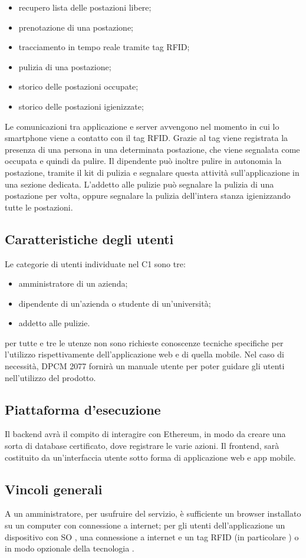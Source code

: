 \begin{itemize}
	\item recupero lista delle postazioni libere; \\
	\item prenotazione di una postazione; \\
	\item tracciamento in tempo reale tramite tag RFID; \\
	\item pulizia di una postazione; \\
	\item storico delle postazioni occupate; \\
	\item storico delle postazioni igienizzate; \\ 
\end{itemize}
Le comunicazioni tra applicazione e server avvengono nel momento in cui lo smartphone viene a contatto con il tag RFID. Grazie al tag viene registrata la presenza di una persona in una determinata postazione, che viene segnalata come occupata e quindi da pulire. Il dipendente può inoltre pulire in autonomia la postazione, tramite il kit di pulizia e segnalare questa attività sull’applicazione in una sezione dedicata.
L’addetto alle pulizie può segnalare la pulizia di una postazione per volta, oppure segnalare la pulizia dell’intera stanza igienizzando tutte le postazioni.

\subsection{Caratteristiche degli utenti}
Le categorie di utenti individuate nel C1 sono tre:
\begin{itemize}
	\item amministratore di un azienda;
	\item dipendente di un'azienda o studente di un'università;
    \item addetto alle pulizie.
\end{itemize}
per tutte e tre le utenze non sono richieste conoscenze tecniche specifiche per l'utilizzo rispettivamente dell'applicazione web e di quella mobile. Nel caso di necessità, DPCM 2077 fornirà un manuale utente per poter guidare gli utenti nell'utilizzo del prodotto.
\subsection{Piattaforma d'esecuzione}
Il backend avrà il compito di interagire con Ethereum, in modo da creare una sorta di database certificato, dove registrare le varie azioni. Il frontend, sarà costituito da un'interfaccia utente sotto forma di applicazione web e app mobile. 
\subsection{Vincoli generali}
A un amministratore, per usufruire del servizio, è sufficiente un browser installato su un computer con connessione a internet; per gli utenti dell'applicazione un dispositivo con SO , una connessione a internet e un tag RFID (in particolare ) o in modo opzionale della tecnologia .

